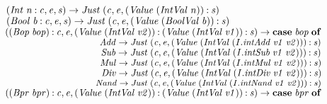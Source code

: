 \documentclass[10pt]{article}
\newcommand{\Conid}[1]{\mathit{#1}}
\newcommand{\Varid}[1]{\mathit{#1}}
\begin{document}
\begin{hscode}
${\hskip4.00em\relax(\Conid{Int}\;\Varid{n}\mathbin{:}\Varid{c},\Varid{e},\Varid{s})\to \Conid{Just}\;(\Varid{c},\Varid{e},(\Conid{Value}\;(\Conid{IntVal}\;\Varid{n}))\mathbin{:}\Varid{s})}$\\
${\hskip4.00em\relax(\Conid{Bool}\;\Varid{b}\mathbin{:}\Varid{c},\Varid{e},\Varid{s})\to \Conid{Just}\;(\Varid{c},\Varid{e},(\Conid{Value}\;(\Conid{BoolVal}\;\Varid{b}))\mathbin{:}\Varid{s})}$\\
${\hskip4.00em\relax((\Conid{Bop}\;\Varid{bop})\mathbin{:}\Varid{c},\Varid{e},(\Conid{Value}\;(\Conid{IntVal}\;\Varid{v2}))\mathbin{:}(\Conid{Value}\;(\Conid{IntVal}\;\Varid{v1}))\mathbin{:}\Varid{s})\to \mathbf{case}\;\Varid{bop}\;\mathbf{of}}$\\
${\hskip4.00em\relax\phantom{((\Conid{Bop}\;\Varid{bop})\mathbin{:}\Varid{c},\Varid{e},(\Conid{Value}\;\mbox{}}\Conid{Add}\to \Conid{Just}\;(\Varid{c},\Varid{e},(\Conid{Value}\;(\Conid{IntVal}\;(\Varid{\Conid{I}.intAdd}\;\Varid{v1}\;\Varid{v2})))\mathbin{:}\Varid{s})}$\\
${\hskip4.00em\relax\phantom{((\Conid{Bop}\;\Varid{bop})\mathbin{:}\Varid{c},\Varid{e},(\Conid{Value}\;\mbox{}}\Conid{Sub}\to \Conid{Just}\;(\Varid{c},\Varid{e},(\Conid{Value}\;(\Conid{IntVal}\;(\Varid{\Conid{I}.intSub}\;\Varid{v1}\;\Varid{v2})))\mathbin{:}\Varid{s})}$\\
${\hskip4.00em\relax\phantom{((\Conid{Bop}\;\Varid{bop})\mathbin{:}\Varid{c},\Varid{e},(\Conid{Value}\;\mbox{}}\Conid{Mul}\to \Conid{Just}\;(\Varid{c},\Varid{e},(\Conid{Value}\;(\Conid{IntVal}\;(\Varid{\Conid{I}.intMul}\;\Varid{v1}\;\Varid{v2})))\mathbin{:}\Varid{s})}$\\
${\hskip4.00em\relax\phantom{((\Conid{Bop}\;\Varid{bop})\mathbin{:}\Varid{c},\Varid{e},(\Conid{Value}\;\mbox{}}\Conid{Div}\to \Conid{Just}\;(\Varid{c},\Varid{e},(\Conid{Value}\;(\Conid{IntVal}\;(\Varid{\Conid{I}.intDiv}\;\Varid{v1}\;\Varid{v2})))\mathbin{:}\Varid{s})}$\\
${\hskip4.00em\relax\phantom{((\Conid{Bop}\;\Varid{bop})\mathbin{:}\Varid{c},\Varid{e},(\Conid{Value}\;\mbox{}}\Conid{Nand}\to \Conid{Just}\;(\Varid{c},\Varid{e},(\Conid{Value}\;(\Conid{IntVal}\;(\Varid{\Conid{I}.intNand}\;\Varid{v1}\;\Varid{v2})))\mathbin{:}\Varid{s})}$\\
${\hskip4.00em\relax((\Conid{Bpr}\;\Varid{bpr})\mathbin{:}\Varid{c},\Varid{e},(\Conid{Value}\;(\Conid{IntVal}\;\Varid{v2}))\mathbin{:}(\Conid{Value}\;(\Conid{IntVal}\;\Varid{v1}))\mathbin{:}\Varid{s})\to \mathbf{case}\;\Varid{bpr}\;\mathbf{of}}$\\

\end{hscode}
\end{document}
